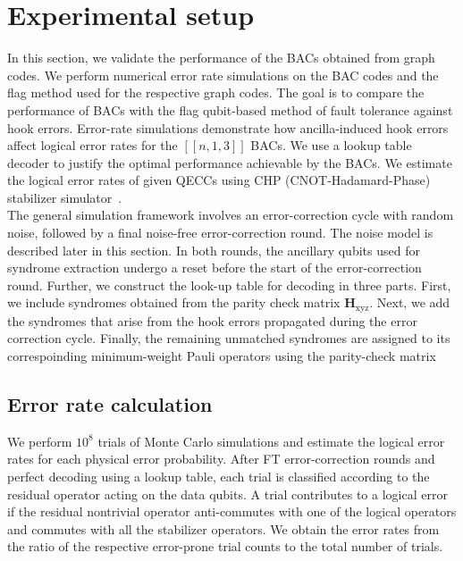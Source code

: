 \documentclass[reprint, amsmath,amssymb, aps,pra,
 floatfix,
]{revtex4-2}
\begin{document}
\section{Experimental setup}
\label{sec:experimental setup}
\noindent In this section, we validate the performance of the BACs obtained from graph codes.
We perform numerical error rate simulations on the BAC codes and the flag method used for the respective graph codes.
The goal is to compare the performance of BACs with the flag qubit-based method of fault tolerance against hook errors.
Error-rate simulations demonstrate how ancilla-induced hook errors affect logical error rates for the $[[n,1,3]]$ BACs.
We use a lookup table decoder to justify the optimal performance achievable by the BACs. 
We estimate the logical error rates of given QECCs using CHP (CNOT-Hadamard-Phase) stabilizer simulator~\cite{PhysRevA.70.052328}.\\
The general simulation framework involves an error-correction cycle with random noise, followed by a final noise-free error-correction round.
The noise model is described later in this section.
In both rounds, the ancillary qubits used for syndrome extraction undergo a reset before the start of the error-correction round.
Further, we construct the look-up table for decoding in three parts.
First, we include syndromes obtained from the parity check matrix $\mathbf{H_\mathrm{xyz}}$.
Next, we add the syndromes that arise from the hook errors propagated during the error correction cycle.
Finally, the remaining unmatched syndromes are assigned to its correspoinding minimum-weight Pauli operators using the parity-check matrix 
\subsection{Error rate calculation}
\noindent We perform $10^8$ trials of Monte Carlo simulations and estimate the logical error rates for each physical error probability.
After FT error-correction rounds and perfect decoding using a lookup table, each trial is classified according to the residual operator acting on the data qubits.
A trial contributes to a logical error if the residual nontrivial operator anti-commutes with one of the logical operators and commutes with all the stabilizer operators. 
We obtain the error rates from the ratio of the respective error-prone trial counts to the total number of trials.
\end{document}
